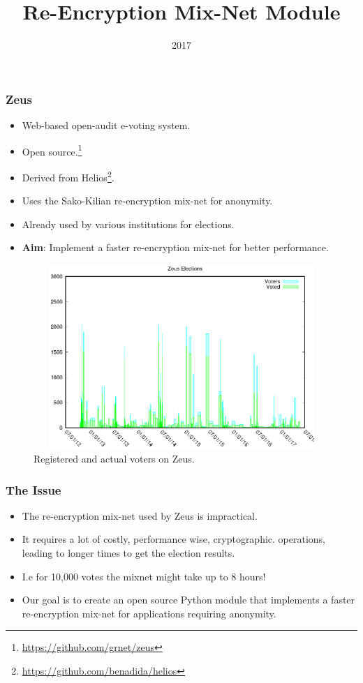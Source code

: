 \documentclass{beamer}
\title{Re-Encryption Mix-Net Module}
\date{2017}
\begin{document}
    \frame{\titlepage}

    \begin{frame}
        \frametitle{Zeus}
        \begin{itemize}
            \item Web-based open-audit e-voting system.
            \item Open source.\footnote{\url{https://github.com/grnet/zeus}}
            \item Derived from Helios\footnote{
                \url{https://github.com/benadida/helios}
            }.
            \item Uses the Sako-Kilian re-encryption mix-net for anonymity.
            \item Already used by various institutions for elections.
            \item \textbf{Aim}: Implement a faster re-encryption mix-net for better
                performance.
        \end{itemize}
    \end{frame}

    \begin{frame}
        \begin{figure}
            \centering
            \includegraphics[width=12cm,height=7cm,keepaspectratio]{zeus-chart.eps}
            \caption{Registered and actual voters on Zeus.}
        \end{figure}
    \end{frame}

    \begin{frame}
        \frametitle{The Issue}
        \begin{itemize}
            \item The re-encryption mix-net used by Zeus is impractical.
            \item It requires a lot of costly, performance wise, cryptographic.
            operations, leading to longer times to get the election results.
            \item I.e for 10,000 votes the mixnet might take up to 8 hours!
            \item Our goal is to create an open source Python module that
            implements a faster re-encryption mix-net for applications
            requiring anonymity.
        \end{itemize}
    \end{frame}
\end{document}
